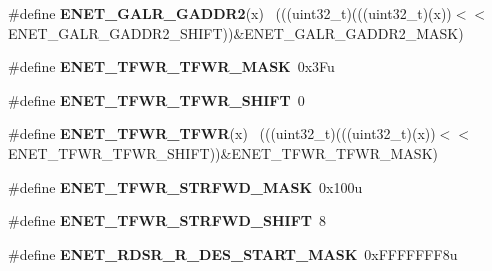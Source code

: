 \begin{DoxyCompactItemize}
\item 
\hypertarget{group___e_n_e_t___register___masks_ga487553c274b1a5c1c9f7f3c3500522ae}{}\#define {\bfseries E\+N\+E\+T\+\_\+\+G\+A\+L\+R\+\_\+\+G\+A\+D\+D\+R2}(x)                                        ~(((uint32\+\_\+t)(((uint32\+\_\+t)(x))$<$$<$E\+N\+E\+T\+\_\+\+G\+A\+L\+R\+\_\+\+G\+A\+D\+D\+R2\+\_\+\+S\+H\+I\+F\+T))\&E\+N\+E\+T\+\_\+\+G\+A\+L\+R\+\_\+\+G\+A\+D\+D\+R2\+\_\+\+M\+A\+S\+K)\label{group___e_n_e_t___register___masks_ga487553c274b1a5c1c9f7f3c3500522ae}

\item 
\hypertarget{group___e_n_e_t___register___masks_gabf947dfd1da7311bb46602d7415a343d}{}\#define {\bfseries E\+N\+E\+T\+\_\+\+T\+F\+W\+R\+\_\+\+T\+F\+W\+R\+\_\+\+M\+A\+S\+K}~0x3\+Fu\label{group___e_n_e_t___register___masks_gabf947dfd1da7311bb46602d7415a343d}

\item 
\hypertarget{group___e_n_e_t___register___masks_ga20649e66e27490be23302b4c87e979b8}{}\#define {\bfseries E\+N\+E\+T\+\_\+\+T\+F\+W\+R\+\_\+\+T\+F\+W\+R\+\_\+\+S\+H\+I\+F\+T}~0\label{group___e_n_e_t___register___masks_ga20649e66e27490be23302b4c87e979b8}

\item 
\hypertarget{group___e_n_e_t___register___masks_gab4eb52288a05d0260785f13b4a87de7c}{}\#define {\bfseries E\+N\+E\+T\+\_\+\+T\+F\+W\+R\+\_\+\+T\+F\+W\+R}(x)                                            ~(((uint32\+\_\+t)(((uint32\+\_\+t)(x))$<$$<$E\+N\+E\+T\+\_\+\+T\+F\+W\+R\+\_\+\+T\+F\+W\+R\+\_\+\+S\+H\+I\+F\+T))\&E\+N\+E\+T\+\_\+\+T\+F\+W\+R\+\_\+\+T\+F\+W\+R\+\_\+\+M\+A\+S\+K)\label{group___e_n_e_t___register___masks_gab4eb52288a05d0260785f13b4a87de7c}

\item 
\hypertarget{group___e_n_e_t___register___masks_gafbad9065556d81ffdbabd31915eb15b9}{}\#define {\bfseries E\+N\+E\+T\+\_\+\+T\+F\+W\+R\+\_\+\+S\+T\+R\+F\+W\+D\+\_\+\+M\+A\+S\+K}~0x100u\label{group___e_n_e_t___register___masks_gafbad9065556d81ffdbabd31915eb15b9}

\item 
\hypertarget{group___e_n_e_t___register___masks_ga4b3c1b7265098b5395df3ed3679058a0}{}\#define {\bfseries E\+N\+E\+T\+\_\+\+T\+F\+W\+R\+\_\+\+S\+T\+R\+F\+W\+D\+\_\+\+S\+H\+I\+F\+T}~8\label{group___e_n_e_t___register___masks_ga4b3c1b7265098b5395df3ed3679058a0}

\item 
\hypertarget{group___e_n_e_t___register___masks_gab49b1d2ba8d51579828593849f9f9f0d}{}\#define {\bfseries E\+N\+E\+T\+\_\+\+R\+D\+S\+R\+\_\+\+R\+\_\+\+D\+E\+S\+\_\+\+S\+T\+A\+R\+T\+\_\+\+M\+A\+S\+K}~0x\+F\+F\+F\+F\+F\+F\+F8u\label{group___e_n_e_t___register___masks_gab49b1d2ba8d51579828593849f9f9f0d}


\end{DoxyCompactItemize}
